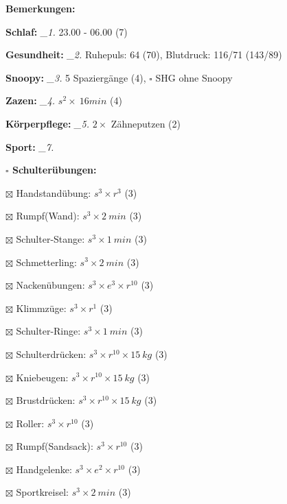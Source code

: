 \documentclass[10pt,a4paper]{article}
\newcommand\prop[1] {{\color {alizarin} {\bf #1}}}             %
\newcommand\mand[1] {{\color {burntorange} {\bf #1}}}          %
\newcommand\topspace{\vskip -15pt \hskip 20pt}
\newcommand\n[1] { {\sl #1.} \hskip 5pt }
\begin{document}
\begin{mdframed}[style=daystyle]
  \begin{labeling}{{\mand {Bemerkungen:}}}
    \setlength\itemsep{-3pt}
  \item[{\mand {Schlaf:}}]        \n{\_1} 23.00 - 06.00 (7)
  \item[{\mand {Gesundheit:}}]    \n{\_2} Ruhepuls: 64 (70), Blutdruck: 116/71 (143/89)
  \item[{\mand {Snoopy:}}]        \n{\_3} 5 Spaziergänge (4), $\square$ SHG ohne Snoopy
  \item[{\mand {Zazen:}}]         \n{\_4} $s^2 \times\ 16 min$ (4)
  \item[{\mand {Körperpflege:}}]  \n{\_5} $2 \times$ Zähneputzen (2)
  \item[{\mand {Sport:}}]         \n{\_7}
    \topspace
    \begin{minipage}{0.75\textwidth}  
      \begin{labeling}{\prop {$\square$ {Schulterübungen:}}} 
        \setlength\itemsep{-3pt}
      \item[$\boxtimes$ Handstandübung:]  $s^3 \times r^{3}$ (3)
      \item[$\boxtimes$ Rumpf(Wand):]     $s^3 \times 2\ min$ (3)
      \item[$\boxtimes$ Schulter-Stange:] $s^3 \times 1\ min$ (3)
      \item[$\boxtimes$ Schmetterling:]   $s^3 \times 2\ min$ (3)
      \item[$\boxtimes$ Nackenübungen:]   $s^3 \times e^3 \times r^{10}$ (3)
      \item[$\boxtimes$ Klimmzüge:]       $s^3 \times r^1$ (3)
      \item[$\boxtimes$ Schulter-Ringe:]  $s^3 \times 1\ min$ (3)
      \item[$\boxtimes$ Schulterdrücken:] $s^3 \times r^{10} \times 15\ kg$ (3)
      \item[$\boxtimes$ Kniebeugen:]      $s^3 \times r^{10} \times 15\ kg$ (3)
      \item[$\boxtimes$ Brustdrücken:]    $s^3 \times r^{10} \times 15\ kg$ (3)
      \item[$\boxtimes$ Roller:]          $s^3 \times r^{10}$ (3)
      \item[$\boxtimes$ Rumpf(Sandsack):] $s^3 \times r^{10}$ (3)
      \item[$\boxtimes$ Handgelenke:]     $s^3 \times e^2 \times r^{10}$ (3)
      \item[$\boxtimes$ Sportkreisel:]    $s^3 \times 2\ min$ (3)

\end{labeling}
\end{minipage}
\end{labeling}
\end{mdframed}
\end{document}
